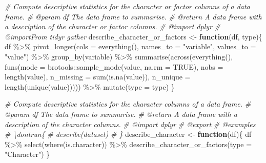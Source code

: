 \documentclass[
]{article}
\newenvironment{Shaded}{\begin{snugshade}}{\end{snugshade}}
\newcommand{\AttributeTok}[1]{\textcolor[rgb]{0.77,0.63,0.00}{#1}}
\newcommand{\CommentTok}[1]{\textcolor[rgb]{0.56,0.35,0.01}{\textit{#1}}}
\newcommand{\ConstantTok}[1]{\textcolor[rgb]{0.00,0.00,0.00}{#1}}
\newcommand{\ControlFlowTok}[1]{\textcolor[rgb]{0.13,0.29,0.53}{\textbf{#1}}}
\newcommand{\FunctionTok}[1]{\textcolor[rgb]{0.00,0.00,0.00}{#1}}
\newcommand{\NormalTok}[1]{#1}
\newcommand{\OtherTok}[1]{\textcolor[rgb]{0.56,0.35,0.01}{#1}}
\newcommand{\SpecialCharTok}[1]{\textcolor[rgb]{0.00,0.00,0.00}{#1}}
\newcommand{\StringTok}[1]{\textcolor[rgb]{0.31,0.60,0.02}{#1}}
\begin{document}
\begin{Shaded}
\begin{Highlighting}[]
\CommentTok{\#\textquotesingle{} Compute descriptive statistics for the character or factor columns of a data frame.}
\CommentTok{\#\textquotesingle{} @param df The data frame to summarise.}
\CommentTok{\#\textquotesingle{} @return A data frame with a description of the character or factor columns.}
\CommentTok{\#\textquotesingle{} @import dplyr}
\CommentTok{\#\textquotesingle{} @importFrom tidyr gather}
\NormalTok{describe\_character\_or\_factors }\OtherTok{\textless{}{-}} \ControlFlowTok{function}\NormalTok{(df, type)\{}
\NormalTok{  df }\SpecialCharTok{\%\textgreater{}\%}
    \FunctionTok{pivot\_longer}\NormalTok{(}\AttributeTok{cols =} \FunctionTok{everything}\NormalTok{(),}
                 \AttributeTok{names\_to =} \StringTok{"variable"}\NormalTok{, }\AttributeTok{values\_to =} \StringTok{"value"}\NormalTok{) }\SpecialCharTok{\%\textgreater{}\%}
    \FunctionTok{group\_by}\NormalTok{(variable) }\SpecialCharTok{\%\textgreater{}\%}
    \FunctionTok{summarise}\NormalTok{(}\FunctionTok{across}\NormalTok{(}\FunctionTok{everything}\NormalTok{(),}
                     \FunctionTok{funs}\NormalTok{(}\AttributeTok{mode =}\NormalTok{ brotools}\SpecialCharTok{::}\FunctionTok{sample\_mode}\NormalTok{(value, }\AttributeTok{na.rm =} \ConstantTok{TRUE}\NormalTok{),}
                     \AttributeTok{nobs =} \FunctionTok{length}\NormalTok{(value),}
                     \AttributeTok{n\_missing =} \FunctionTok{sum}\NormalTok{(}\FunctionTok{is.na}\NormalTok{(value)),}
                     \AttributeTok{n\_unique =} \FunctionTok{length}\NormalTok{(}\FunctionTok{unique}\NormalTok{(value))))) }\SpecialCharTok{\%\textgreater{}\%}
    \FunctionTok{mutate}\NormalTok{(}\AttributeTok{type =}\NormalTok{ type)}
\NormalTok{\}}

\CommentTok{\#\textquotesingle{} Compute descriptive statistics for the character columns of a data frame.}
\CommentTok{\#\textquotesingle{} @param df The data frame to summarise.}
\CommentTok{\#\textquotesingle{} @return A data frame with a description of the character columns.}
\CommentTok{\#\textquotesingle{} @import dplyr}
\CommentTok{\#\textquotesingle{} @export}
\CommentTok{\#\textquotesingle{} @examples}
\CommentTok{\#\textquotesingle{} \textbackslash{}dontrun\{}
\CommentTok{\#\textquotesingle{} describe(dataset)}
\CommentTok{\#\textquotesingle{} \}}
\NormalTok{describe\_character }\OtherTok{\textless{}{-}} \ControlFlowTok{function}\NormalTok{(df)\{}
\NormalTok{  df }\SpecialCharTok{\%\textgreater{}\%}
    \FunctionTok{select}\NormalTok{(}\FunctionTok{where}\NormalTok{(is.character)) }\SpecialCharTok{\%\textgreater{}\%}
    \FunctionTok{describe\_character\_or\_factors}\NormalTok{(}\AttributeTok{type =} \StringTok{"Character"}\NormalTok{)}
\NormalTok{\}}
\end{Highlighting}
\end{Shaded}
\end{document}
